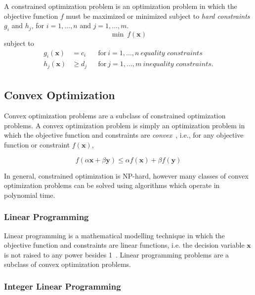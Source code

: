 \documentclass[../mthe-493-final-project.tex]{subfiles}
\begin{document}
    A constrained optimization problem is an optimization problem in which the objective function $f$ must be maximized or minimized subject to \textit{hard constraints} $g_i$ and $h_j$, for $i=1,...,n$ and $j=1,...,m$.
    \[ \min \ f(\mathbf{x}) \]
    subject to
    \begin{align*}
        g_i(\mathbf{x}) &= c_i    & &\text{for} \ i = 1,...,n \ \textit{equality constraints}    \\
        h_j(\mathbf{x}) &\geq d_j & &\text{for} \ j = 1,...,m \ \textit{inequality constraints}. \\
    \end{align*}

    \subsection{Convex Optimization}
    \label{ssec:convex-optimization}
    
    Convex optimization problems are a subclass of constrained optimization problems. A convex optimization problem is simply an optimization problem in which the objective function and constraints are \textit{convex}~\cite{boyd_vandenberghe_2009}, i.e., for any objective function or constraint $f(\mathbf{x})$, 
        
        \[ f(\alpha \mathbf{x} + \beta \mathbf{y}) \leq \alpha f(\mathbf{x}) + \beta f(\mathbf{y}) \]
        
    In general, constrained optimization is NP-hard, however many classes of convex optimization problems can be solved using algorithms which operate in polynomial time.
    
    \subsubsection{Linear Programming}
    \label{sssec:linear-programming}
    
    Linear programming is a mathematical modelling technique in which the objective function and constraints are linear functions, i.e. the decision variable $\mathbf{x}$ is not raised to any power besides 1~\cite{the_editors_of_encyclopaedia_britannica_2017}. Linear programming problems are a subclass of convex optimization problems.
    
    \subsubsection{Integer Linear Programming}
    
\end{document}
